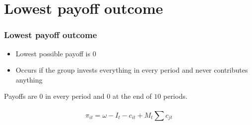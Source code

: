 \section{Lowest payoff outcome}

	\begin{frame}
		\frametitle{Lowest payoff outcome} 
		
		\begin{itemize}
			\item
				Lowest possible payoff is $0$
			\item
				Occurs if the group invests everything in every period and never contributes anything		
		\end{itemize} 
		
		Payoffs are $0$ in every period and $0$ at the end of $10$ periods. \\~\\
		
		\[
			\pi_{it} = \omega - I_t - c_{it} + M_t \sum c_{jt}
		\]
		
	\end{frame}